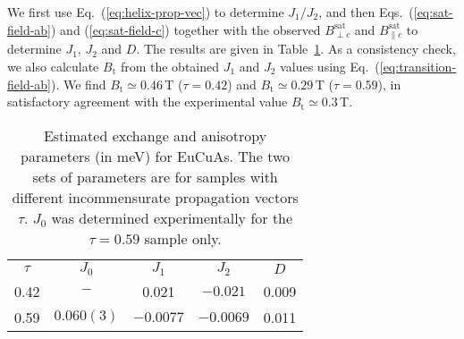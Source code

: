 \documentclass[aps,prl,amsmath,amssymb,amstext,citeautoscript,punctuation,nofootinbib,superscriptaddress,twocolumn]{revtex4-1}
\begin{document}
We first use Eq.~(\ref{eq:helix-prop-vec}) to determine $J_1/J_2$, and then Eqs.~(\ref{eq:sat-field-ab}) and (\ref{eq:sat-field-c}) together with the observed $B_{\perp c}^\textrm{sat}$ and $B_{\parallel c}^\textrm{sat}$ to determine $J_1$, $J_2$ and $D$.  The results are given in Table~\ref{Table:H-params}. As a consistency check, we also calculate $B_\textrm{t}$ from the obtained $J_1$ and $J_2$ values using Eq.~(\ref{eq:transition-field-ab}). We find $B_\textrm{t} \simeq 0.46$\,T ($\tau=0.42$) and $B_\textrm{t} \simeq0.29$\,T ($\tau=0.59$), in satisfactory agreement with the experimental value $B_\textrm{t} \simeq 0.3$\,T.

\begin{table}[bt]
\caption{\label{table2}\label{Table:H-params} Estimated exchange and anisotropy parameters (in meV) for EuCuAs. The two sets of parameters are for samples with different incommensurate propagation vectors $\tau$. $J_0$ was determined experimentally for the $\tau=0.59$ sample only.}
\begin{ruledtabular}
\begin{tabular}{ccccc}
$\tau$ & $J_0$ & $J_1$ & $J_2$ & $D$\\
0.42 & $-$ & 0.021 & $-0.021$ & 0.009\\
0.59 & $0.060(3)$ & $-0.0077$ & $-0.0069$ & 0.011\\
\end{tabular}
\end{ruledtabular}
\end{table}
\end{document}
